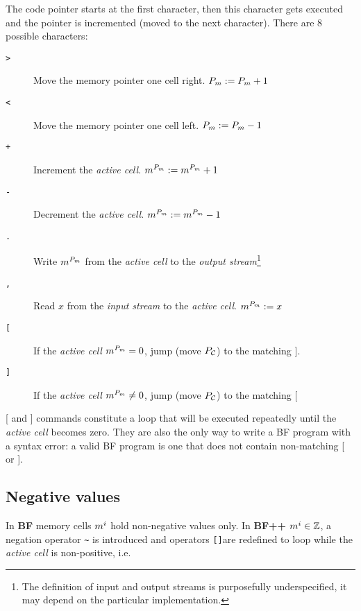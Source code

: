 The code pointer starts at the first character, then this character gets executed and the pointer is incremented (moved to the next character).
There are 8 possible characters:

\begin{description}
\item[\texttt{>}] Move the memory pointer one cell right. $P_m := P_m + 1$
\item[\texttt{<}] Move the memory pointer one cell left. $P_m := P_m - 1$
\item[\texttt{+}] Increment the \textit{active cell}. $m^{P_m} := m^{P_m} + 1$
\item[\texttt{-}] Decrement the \textit{active cell}. $m^{P_m} := m^{P_m} - 1$
\item[\texttt{.}] Write $m^{P_m}$ from the \textit{active cell} to the \textit{output stream}\footnote{The definition of input and output streams is purposefully underspecified, it may depend on the particular implementation.}
\item[\texttt{,}] Read $x$ from the \textit{input stream} to the \textit{active cell}. $m^{P_m} := x$
\item[ \texttt{[} ] If the \textit{active cell} $m^{P_m} = 0$, jump (move $P_{\mathcal{C}}$) to the matching $]$.
\item[ \texttt{]} ] If the \textit{active cell} $m^{P_m} \neq 0$, jump (move $P_{\mathcal{C}}$) to the matching $[$
\end{description}

[ and ] commands constitute a loop that will be executed repeatedly until the \textit{active cell} becomes zero.
They are also the only way to write a BF program with a syntax error: a valid BF program is one that does not contain non-matching [ or ].


\subsection{Negative values}

In \textbf{BF} memory cells $m^i$ hold non-negative values only.
In \textbf{BF++} $m^i \in \mathbb{Z}$, a negation operator \texttt{\~} is introduced and operators \texttt{[]}are redefined to loop while the \textit{active cell} is non-positive, i.e.

